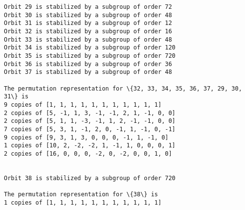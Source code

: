 \documentclass[11pt]{article}
\begin{document}
\begin{Verbatim}[commandchars=\\\{\}]
Orbit 29 is stabilized by a subgroup of order 72
Orbit 30 is stabilized by a subgroup of order 48
Orbit 31 is stabilized by a subgroup of order 12
Orbit 32 is stabilized by a subgroup of order 16
Orbit 33 is stabilized by a subgroup of order 48
Orbit 34 is stabilized by a subgroup of order 120
Orbit 35 is stabilized by a subgroup of order 720
Orbit 36 is stabilized by a subgroup of order 36
Orbit 37 is stabilized by a subgroup of order 48

The permutation representation for \{32, 33, 34, 35, 36, 37, 29, 30, 31\} is
9 copies of [1, 1, 1, 1, 1, 1, 1, 1, 1, 1, 1]
2 copies of [5, -1, 1, 3, -1, -1, 2, 1, -1, 0, 0]
2 copies of [5, 1, 1, -3, -1, 1, 2, -1, -1, 0, 0]
7 copies of [5, 3, 1, -1, 2, 0, -1, 1, -1, 0, -1]
9 copies of [9, 3, 1, 3, 0, 0, 0, -1, 1, -1, 0]
1 copies of [10, 2, -2, -2, 1, -1, 1, 0, 0, 0, 1]
2 copies of [16, 0, 0, 0, -2, 0, -2, 0, 0, 1, 0]


Orbit 38 is stabilized by a subgroup of order 720

The permutation representation for \{38\} is
1 copies of [1, 1, 1, 1, 1, 1, 1, 1, 1, 1, 1]


    \end{Verbatim}


    
    
    
\end{document}
